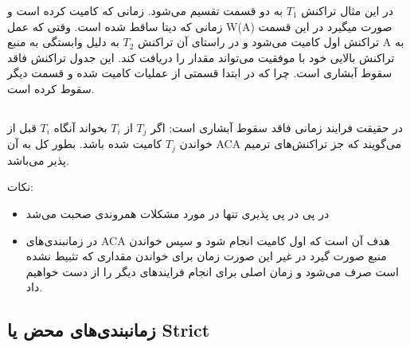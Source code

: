 \documentclass[a4paper]{article}
\begin{document}
در این مثال تراکنش $T_{1}$ به دو قسمت تقسیم می‌شود. زمانی که کامیت کرده است و
زمانی که دیتا ساقط شده است. وقتی که عمل W(A) صورت میگیرد در این قسمت تراکنش اول
کامیت می‌شود و در راستای آن تراکنش $T_{2}$ به دلیل وابستگی به منبع A به تراکنش
بالایی خود با موفقیت می‌تواند مقدار را دریافت کند. این جدول تراکنش فاقد سقوط
آبشاری است. چرا که در ابتدا قسمتی از عملیات کامیت شده و قسمت دیگر سقوط کرده است.

\subsection{}

در حقیقت فرایند زمانی فاقد سقوط آبشاری است; اگر $T_{j}$ از $T_{i}$ بخواند آنگاه
$T_{i}$ قبل از خواندن $T_{j}$ کامیت شده باشد. بطور کل به آن ACA می‌گویند که جز
تراکنش‌های ترمیم پذیر می‌باشد.

\begin{LTR}
    \begin{table}[h]
        \centering
        \begin{RTL}
            \caption{نمونه‌ای از فرایند ACA}
        \end{RTL}
    \end{table}
\end{LTR}

نکات:

\begin{itemize}
    \item در پی در پی پذیری تنها در مورد مشکلات همروندی صحبت می‌شد
    \item در زمانبندی‌های ACA هدف آن است که اول کامیت انجام شود و سپس خواندن
    منبع صورت گیرد در غیر این صورت زمان برای خواندن مقداری که تثبیط نشده است صرف
    می‌شود و زمان اصلی برای انجام فرایند‌های دیگر را از دست خواهیم داد.
\end{itemize}

\subsection{زمانبندی‌های محض یا Strict}
\end{document}
